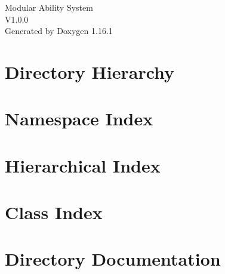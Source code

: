 \documentclass[twoside]{book}
\newcommand{\+}{\discretionary{\mbox{\scriptsize$\hookleftarrow$}}{}{}}
\newcommand{\clearemptydoublepage}{%
    \newpage{\pagestyle{empty}\cleardoublepage}%
  }
\begin{document}
  \raggedbottom
    \hypersetup{pageanchor=false,
                bookmarksnumbered=true,
                pdfencoding=unicode
               }
  \begin{titlepage}
  \vspace*{7cm}
  \begin{center}%
  {\Large Modular Ability System}\\
  [1ex]\large V1.\+0.\+0 \\
  \vspace*{1cm}
  {\large Generated by Doxygen 1.16.1}\\
  \end{center}
  \end{titlepage}
  \clearemptydoublepage
  \tableofcontents
  \clearemptydoublepage
  \hypersetup{pageanchor=true}







\chapter{Directory Hierarchy}

\chapter{Namespace Index}

\chapter{Hierarchical Index}

\chapter{Class Index}

\chapter{Directory Documentation}













\end{document}
